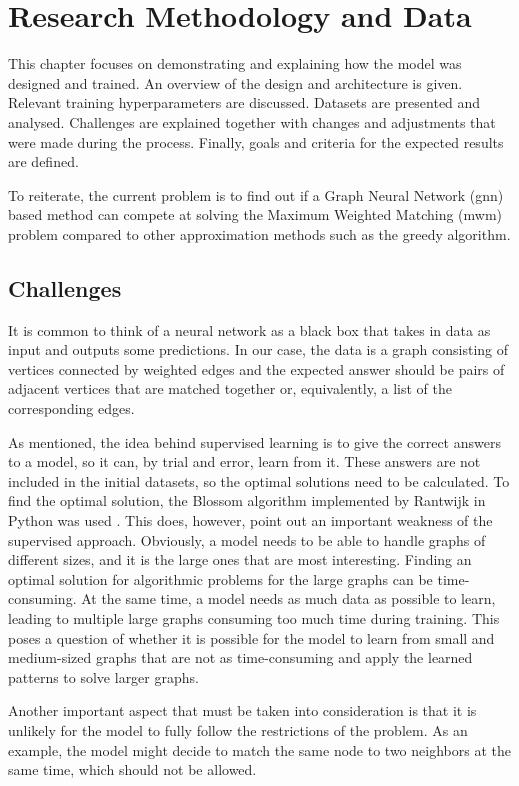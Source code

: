 \chapter{Research Methodology and Data}

This chapter focuses on demonstrating and explaining how the model was designed and trained. An overview of the design and architecture is given. Relevant training hyperparameters are discussed. Datasets are presented and analysed. Challenges are explained together with changes and adjustments that were made during the process. Finally, goals and criteria for the expected results are defined.

To reiterate, the current problem is to find out if a Graph Neural Network (\gls{gnn}) based method can compete at solving the Maximum Weighted Matching (\gls{mwm}) problem compared to other approximation methods such as the greedy algorithm.

\section{Challenges}

It is common to think of a neural network as a black box that takes in data as input and outputs some predictions. In our case, the data is a graph consisting of vertices connected by weighted edges and the expected answer should be pairs of adjacent vertices that are matched together or, equivalently, a list of the corresponding edges.

As mentioned, the idea behind supervised learning is to give the correct answers to a model, so it can, by trial and error, learn from it. These answers are not included in the initial datasets, so the optimal solutions need to be calculated. To find the optimal solution, the Blossom algorithm implemented by Rantwijk in Python was used \cite{mwmBlossom}. This does, however, point out an important weakness of the supervised approach. Obviously, a model needs to be able to handle graphs of different sizes, and it is the large ones that are most interesting. Finding an optimal solution for algorithmic problems for the large graphs can be time-consuming. At the same time, a model needs as much data as possible to learn, leading to multiple large graphs consuming too much time during training. This poses a question of whether it is possible for the model to learn from small and medium-sized graphs that are not as time-consuming and apply the learned patterns to solve larger graphs.

Another important aspect that must be taken into consideration is that it is unlikely for the model to fully follow the restrictions of the problem. As an example, the model might decide to match the same node to two neighbors at the same time, which should not be allowed. 

